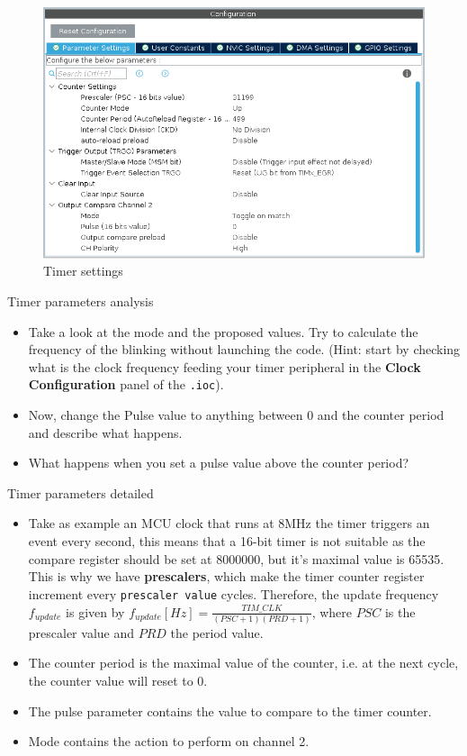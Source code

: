 \begin{figure}[h]
    \centering
    \includegraphics[scale=0.65]{figures/tim_settings}
    \caption{Timer settings}
    \label{fig:tim_settings}
\end{figure}


\begin{bclogo}[couleur = gray!20, arrondi = 0.2, logo=\bcquestion]{Timer parameters analysis}
\begin{itemize}
    \item Take a look at the mode and the proposed values. Try to calculate the frequency of the blinking without launching the code. (Hint: start by checking what is the clock frequency feeding your timer peripheral in the \textbf{Clock Configuration} panel of the \texttt{.ioc}).
    \item Now, change the Pulse value to anything between 0 and the counter period and describe what happens.
    \item What happens when you set a pulse value above the counter period?
\end{itemize}
\end{bclogo}

\begin{bclogo}[couleur = gray!20, arrondi = 0.2, logo=\bcinfo]{Timer parameters detailed}
\begin{itemize}
    \item Take as example an MCU clock that runs at 8MHz the timer triggers an event every second, this means that a 16-bit timer is not suitable as the compare register should be set at 8000000, but it's maximal value is 65535. This is why we have \textbf{prescalers}, which make the timer counter register increment every \texttt{prescaler value} cycles. Therefore, the update frequency $f_{update}$ is given by $f_{update} [Hz] = \frac{TIM\_CLK}{(PSC+1)(PRD+1)}$, where $PSC$ is the prescaler value and $PRD$ the period value.
    \item The counter period is the maximal value of the counter, i.e. at the next cycle, the counter value will reset to 0.
    \item The pulse parameter contains the value to compare to the timer counter.
    \item Mode contains the action to perform on channel 2.
 \end{itemize}
\end{bclogo}


